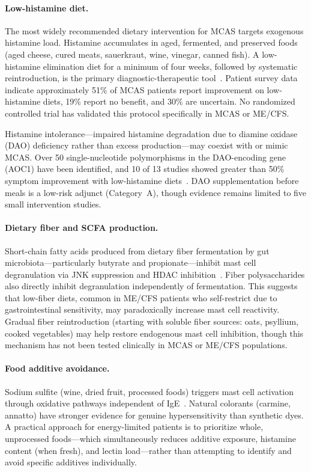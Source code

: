 \paragraph{Low-histamine diet.}
The most widely recommended dietary intervention for MCAS targets exogenous histamine load. Histamine accumulates in aged, fermented, and preserved foods (aged cheese, cured meats, sauerkraut, wine, vinegar, canned fish). A low-histamine elimination diet for a minimum of four weeks, followed by systematic reintroduction, is the primary diagnostic-therapeutic tool~\cite{ComasBaste2020histamine}. Patient survey data indicate approximately 51\% of MCAS patients report improvement on low-histamine diets, 19\% report no benefit, and 30\% are uncertain. No randomized controlled trial has validated this protocol specifically in MCAS or ME/CFS.

Histamine intolerance---impaired histamine degradation due to diamine oxidase (DAO) deficiency rather than excess production---may coexist with or mimic MCAS. Over 50 single-nucleotide polymorphisms in the DAO-encoding gene (AOC1) have been identified, and 10 of 13 studies showed greater than 50\% symptom improvement with low-histamine diets~\cite{ComasBaste2020histamine}. DAO supplementation before meals is a low-risk adjunct (Category~A), though evidence remains limited to five small intervention studies.

\paragraph{Dietary fiber and SCFA production.}
Short-chain fatty acids produced from dietary fiber fermentation by gut microbiota---particularly butyrate and propionate---inhibit mast cell degranulation via JNK suppression and HDAC inhibition~\cite{Folkerts2018fiber}. Fiber polysaccharides also directly inhibit degranulation independently of fermentation. This suggests that low-fiber diets, common in ME/CFS patients who self-restrict due to gastrointestinal sensitivity, may paradoxically increase mast cell reactivity. Gradual fiber reintroduction (starting with soluble fiber sources: oats, psyllium, cooked vegetables) may help restore endogenous mast cell inhibition, though this mechanism has not been tested clinically in MCAS or ME/CFS populations.

\paragraph{Food additive avoidance.}
Sodium sulfite (wine, dried fruit, processed foods) triggers mast cell activation through oxidative pathways independent of IgE~\cite{Pepper2020additives}. Natural colorants (carmine, annatto) have stronger evidence for genuine hypersensitivity than synthetic dyes. A practical approach for energy-limited patients is to prioritize whole, unprocessed foods---which simultaneously reduces additive exposure, histamine content (when fresh), and lectin load---rather than attempting to identify and avoid specific additives individually.


